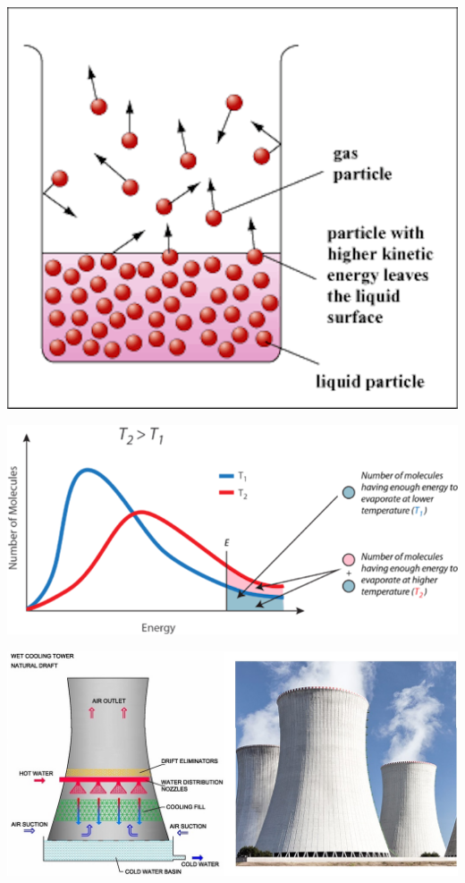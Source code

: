 \documentclass[
  letterpaper,
  DIV=11,
  numbers=noendperiod]{scrreprt}
\begin{document}
\includegraphics{archive/figures/evaporation_1.png}

\includegraphics{archive/figures/evaporation_2.png}

\includegraphics{archive/figures/cooling-tower.png}
\end{document}
